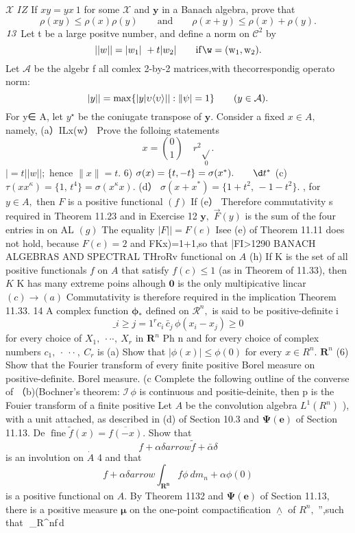 $\scriptstyle{\mathcal{X}}$ ${\mathit{I}}{\mathit{Z}}$ If $x y=y x\ 1$ for some $\scriptstyle{\mathcal{X}}$ and $\mathbf{y}$ in a Banach algebra, prove that $$ \rho(x y)\leq\rho(x)\rho(y)\qquad\mathrm{and}\qquad\rho(x+y)\leq\rho(x)+\rho(y). $$ ${\it\it1}{\it3}$ Let t be a large positve number, and define a norm on ${\mathcal{C}}^{2}$ by $$ ||w||=|w_{1}|\ +t|w_{2}|\qquad\mathrm{if\w=(w_{1},w_{2}).} $$ Let $\scriptstyle{\mathcal{A}}$ be the algebr f all comlex 2-by-2 matrices,with thecorrespondig operato norm: $$ |y||=\operatorname*{max}\{|y|\upsilon\langle\upsilon\rangle||:\|\psi|=1\}\qquad(y\in{\cal A}). $$ For y∈ A, let $y^{\star}$ be the coniugate transpose of ${\boldsymbol{y}}.$ Consider a fixed $x\in A,$ namely, (a）ILx(w） Prove the folloing statements $$ x={\binom{0}{1}}\quad r^{2}{\underset{0}{\sqrt{}}{}}. $$ $|=t||w||;$ hence $\|x\|=t.$ 6) $\sigma(x)=\{t,-t\}=\sigma(x^{\ast}).\qquad\d t^{\ast}$ (c) $\tau(x x^{\kappa})=\{1,\,t^{4}\}=\sigma(x^{\kappa}x).$ (d） $\sigma(x+x^{*})=\{1+t^{2},\,-1-t^{2}\}.$ , for $y\in A,$ then ${\mathbf{}}F$ is a positive functional $(f)$ If (e） Therefore commutativity s required in Theorem 11.23 and in Exercise 12 ${\boldsymbol{y}},$ $\scriptstyle{\vec{F}}(y)$ is the sum of the four entries in on AL $(g)$ The equality $|F||=F(e)$ Isee (e) of Theorem 11.11 does not hold, because $F(e)=2$ and FKx)=1+1,so that |FI>1290 BANACH ALGEBRAS AND SPECTRAL THroRv functional on $\textstyle A$ (h) If K is the set of all positive functionals $\boldsymbol{\mathit{f}}$ on $\textstyle A$ that satisfy $f(c)\leq1$ (as in Theorem of 11.33), then $\textstyle K$ K has many extreme poins alhough $\mathbf{0}$ is the only multipicative lincar $(c)\to(a)$ Commutativity is therefore required in the implication Theorem 11.33. 14 A complex function ${\boldsymbol{\phi}}_{*}$ defined on ${\textstyle\mathcal{R}}^{n},$ is said to be positive-definite i $$ \_{i\geq j=1}^{r}c_{i}\,\bar{c}_{j}\,\phi(x_{i}-x_{j})\geq0 $$ for every choice of $X_{1},\ \cdot\cdot\cdot,\ X_{r}$ in ${\boldsymbol{R}}^{n}$ Ph n and for every choice of complex numbers $c_{1},\ \cdot\ \cdot\cdot\ ,\ C_{r}$ is (a) Show that $|\phi(x)|\leq\phi(0)$ for every $x\in R^{n}.$ ${\boldsymbol{R}}^{n}$ (6) Show that the Fourier transform of every finite positive Borel measure on positive-definite. Borel measure. (c Complete the following outline of the converse of （b)(Bochner's theorem: ${\mathcal{I}}\,\phi$ is continuous and positie-deinite, then p is the Fouier transform of a finite positive Let $\scriptstyle{A}$ be the convolution algebra $L^{1}(R^{n})$ ), with a unit attached, as described in (d) of Section 10.3 and $\mathbf{\Psi}({\boldsymbol{e}})$ of Section 11.13. De $\operatorname{fine}{\tilde{f}}(x)={\overline{{f(-x)}}}.$ Show that $$ f+\alpha\delta arrow\tilde{f}+\bar{\alpha}\delta $$ is an involution on $\scriptstyle{\dot{A}}$ 4 and that $$ f+\alpha\delta arrow\int_{\boldsymbol{R^{n}}}f\phi\ d m_{n}+\alpha\phi(0) $$ is a positive functional on $A.$ By Theorem 1132 and $\mathbf{\Psi}({\boldsymbol{e}})$ of Section 11.13, there is a positive measure $\boldsymbol{\mu}$ on the one-point compactification $\underline{{\land}}$ of $\textstyle R^{n}\!,$ ”,such that $$ \int_{{\cal R}^{n}}f\phi\,d 